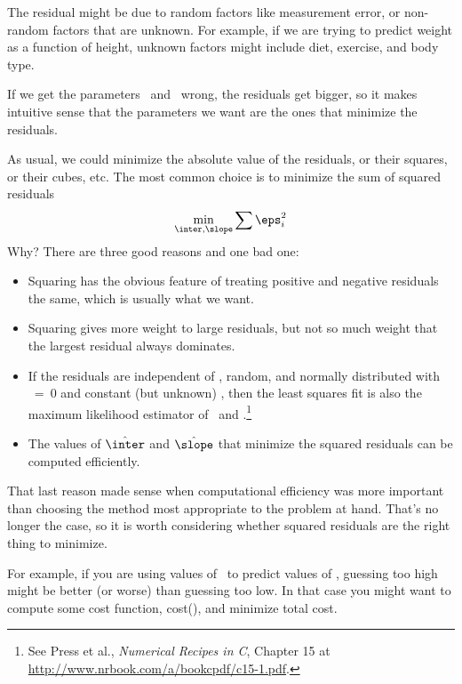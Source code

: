 \documentclass[12pt]{book}
\begin{document}

The residual might be due to random factors like measurement error,
or non-random factors that are unknown.  For example, if we are
trying to predict weight as a function of height, unknown factors
might include diet, exercise, and body type.

If we get the parameters \myinter~and \myslope~wrong, the residuals
get bigger, so it makes intuitive sense that the parameters we want
are the ones that minimize the residuals.

As usual, we could minimize the absolute value of the
residuals, or their squares, or their cubes, etc.  The most common
choice is to minimize the sum of squared residuals
%
\[ \min_{\inter, \slope} \sum \eps_i^2 \]
%
Why?  There are three good reasons and one bad one:

\begin{itemize}

\item Squaring has the obvious feature of treating positive and
negative residuals the same, which is usually what we want.

\item Squaring gives more weight to large residuals, but not
so much weight that the largest residual always dominates.

\item If the residuals are independent of \x, random, and normally
  distributed with \mymu~=~0 and constant (but unknown) \mysigma, then
  the least squares fit is also the maximum likelihood estimator of
  \myinter~and \myslope.\footnote{See Press et al., {\em Numerical Recipes in C},
    Chapter 15 at \url{http://www.nrbook.com/a/bookcpdf/c15-1.pdf}.}

\item The values of $\hat{\inter}$ and $\hat{\slope}$ that minimize
  the squared residuals can be computed efficiently.

\end{itemize}

That last reason made sense when computational efficiency was more
important than choosing the method most appropriate to the problem
at hand.  That's no longer the case, so it is worth considering
whether squared residuals are the right thing to minimize.

For example, if you are using values of \X~to predict values of \Y,
guessing too high might be better (or worse) than guessing too low.
In that case you might want to compute some cost function,
cost(\myeps{}), and minimize total cost.
\end{document}
